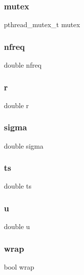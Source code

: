 \subsubsection{mutex}
{\footnotesize\ttfamily pthread\+\_\+mutex\+\_\+t mutex}

\mbox{\label{structsf__struct_abe8c9f398f1cfe8f4e92d9fb4db031e3}} 
\subsubsection{nfreq}
{\footnotesize\ttfamily double nfreq}

\mbox{\label{structsf__struct_a880a49112fedae68e714341a9a082fb6}} 
\subsubsection{r}
{\footnotesize\ttfamily double r}

\mbox{\label{structsf__struct_a4ef930be9d7ab47d59cc0668d0d1fac8}} 
\subsubsection{sigma}
{\footnotesize\ttfamily double sigma}

\mbox{\label{structsf__struct_af3ced383b74c2aea501e1279392f1ea4}} 
\subsubsection{ts}
{\footnotesize\ttfamily double ts}

\mbox{\label{structsf__struct_aed08c8478a62910aab06ba708a0e5b5f}} 
\subsubsection{u}
{\footnotesize\ttfamily double u}

\mbox{\label{structsf__struct_ad694781c319f7ac04c4b381152b4abaf}} 
\subsubsection{wrap}
{\footnotesize\ttfamily bool wrap}

